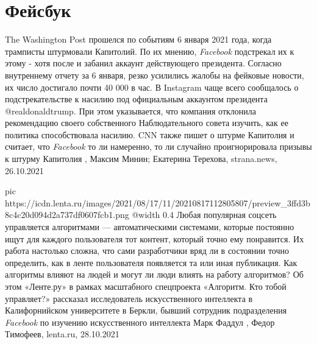  
 
 
 
 
\chapter{Фейсбук}

The Washington Post прошелся по событиям 6 января 2021 года, когда трамписты
штурмовали Капитолий. По их мнению, \emph{Facebook} подстрекал их к этому -
хотя после и забанил аккаунт действующего президента.  Согласно внутреннему
отчету за 6 января, резко усилились жалобы на фейковые новости, их число
достигало почти 40 000 в час. В Instagram чаще всего сообщалось о
подстрекательстве к насилию под официальным аккаунтом президента
@realdonaldtrump.  При этом указывается, что компания отклонила рекомендацию
своего собственного Наблюдательного совета изучить, как ее политика
способствовала насилию.  CNN также пишет о штурме Капитолия и считает, что
\emph{Facebook} то ли намеренно, то ли случайно проигнорировала призывы к
штурму Капитолия
, 
Максим Минин; Екатерина Терехова, strana.news, 26.10.2021

\ifcmt
  pic https://icdn.lenta.ru/images/2021/08/17/11/20210817112805807/preview_3ffd3b8c4c20d094d2a737df0607fcb1.png
  @width 0.4
\fi
Любая популярная соцсеть управляется алгоритмами — автоматическими системами,
которые постоянно ищут для каждого пользователя тот контент, который точно ему
понравится. Их работа настолько сложна, что сами разработчики вряд ли в
состоянии точно определить, как в ленте пользователя появляется та или иная
публикация. Как алгоритмы влияют на людей и могут ли люди влиять на работу
алгоритмов? Об этом «Ленте.ру» в рамках масштабного спецпроекта «Алгоритм. Кто
тобой управляет?» рассказал исследователь искусственного интеллекта в
Калифорнийском университете в Беркли, бывший сотрудник подразделения \emph{Facebook}
по изучению искусственного интеллекта Марк Фаддул
, 
Федор Тимофеев, lenta.ru, 28.10.2021
